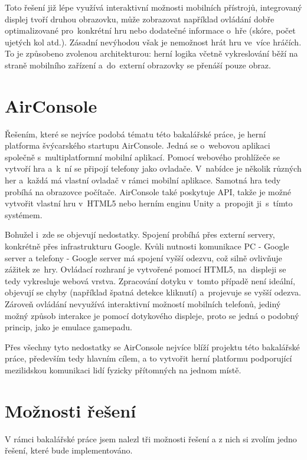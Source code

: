 \documentclass[thesis=B,czech,hidelinks]{FITthesis}[2012/06/26] %
\begin{document}
Toto řešení již lépe využívá interaktivní možnosti mobilních přístrojů, integrovaný displej tvoří druhou obrazovku, může zobrazovat například ovládání dobře optimalizované pro~konkrétní hru nebo dodatečné informace o~hře (skóre, počet ujetých kol atd.). Zásadní nevýhodou však je nemožnost hrát hru ve~více hráčích. To je způsobeno zvolenou architekturou: herní logika včetně vykreslování běží na straně mobilního zařízení a~do~externí obrazovky se přenáší pouze obraz.

\section{AirConsole}

Řešením, které se nejvíce podobá tématu této bakalářské práce, je herní platforma švýcarského startupu AirConsole\cite{airconsole}. Jedná se o~webovou aplikaci společně s~multiplatformní mobilní aplikací. Pomocí webového prohlížeče se vytvoří hra a~k~ní se připojí telefony jako ovladače. V~nabídce je několik různých her a~každá má vlastní ovladač v rámci mobilní aplikace. Samotná hra tedy probíhá na obrazovce počítače. AirConsole také poskytuje API, takže je možné vytvořit vlastní hru v~HTML5 nebo herním enginu Unity a~propojit ji~s~tímto systémem.

Bohužel i~zde se objevují nedostatky. Spojení probíhá přes externí servery, konkrétně přes infrastrukturu Google\cite{airconsole}. Kvůli nutnosti komunikace PC - Google server a telefony - Google server má spojení vyšší odezvu, což silně ovlivňuje zážitek ze~hry. Ovládací rozhraní je vytvořené pomocí HTML5, na~displeji se tedy vykresluje webová vrstva. Zpracování dotyku v~tomto případě není ideální, objevují se chyby (například špatná detekce kliknutí) a~projevuje se vyšší odezva. Zároveň ovládání nevyužívá interaktivní možností mobilních telefonů, jediný možný způsob interakce je pomocí dotykového displeje, proto se jedná o podobný princip, jako je emulace gamepadu.

Přes všechny tyto nedostatky se AirConsole nejvíce blíží projektu této bakalářské práce, především tedy hlavním cílem, a to vytvořit herní platformu podporující mezilidskou komunikaci lidí fyzicky přítomných na jednom místě.

\section{Možnosti řešení}

V rámci bakalářské práce jsem nalezl tři možnosti řešení a z nich si zvolím jedno řešení, které bude implementováno.
\end{document}
